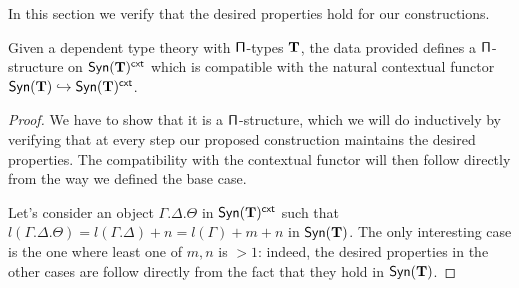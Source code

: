 In this section we verify that the desired properties hold for our
constructions.

\begin{lem}
  Given a dependent type theory with $\operatorname{\mathsf{\Pi}}$-types $\operatorname{\mathbf{T}}$, the data provided
  defines a $\operatorname{\mathsf{\Pi}}$-structure on $\mathsf{Syn}(\mathbf{T})^{\operatorname{\mathsf{cxt}}}$ which is
  compatible with the natural contextual functor
  $\mathsf{Syn}(\mathbf{T})\hookrightarrow\mathsf{Syn}(\mathbf{T})^{\operatorname{\mathsf{cxt}}}$.
\end{lem}
\begin{proof}
  We have to
  show that it is a $\operatorname{\mathsf{\Pi}}$-structure, which we will do inductively by verifying
  that at every step our proposed construction maintains the desired properties.
  The compatibility with the contextual functor will then follow directly from
  the way we defined the base case.

  Let's consider an object $\Gamma.\Delta.\Theta$ in $\mathsf{Syn}(\mathbf{T})^{\operatorname{\mathsf{cxt}}}$ such that
  $l(\Gamma.\Delta.\Theta)=l(\Gamma.\Delta)+n=l(\Gamma)+m+n$ in $\mathsf{Syn}(\mathbf{T})$. The
  only interesting case is the one where least one of $m,n$ is
  $>1$: indeed, the desired properties in the other cases are
  follow directly from the fact that they hold in $\mathsf{Syn}(\mathbf{T})$.


\end{proof}
